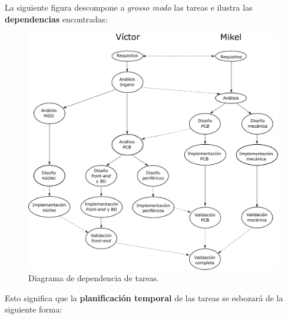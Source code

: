 La siguiente figura descompone a \textit{grosso modo} las tareas e ilustra las \textbf{dependencias} encontradas:

\smallskip

\begin{figure}[H]
	\noindent \begin{centering}
		\includegraphics[width=\linewidth*3/4]{capitulo5/planificacion}
		\par\end{centering}
	\smallskip
	\caption{\label{fig:planificacion} Diagrama de dependencia de tareas.}
\end{figure} 

\smallskip

Esto significa que la \textbf{planificación temporal} de las tareas se esbozará de la siguiente forma:

\smallskip

